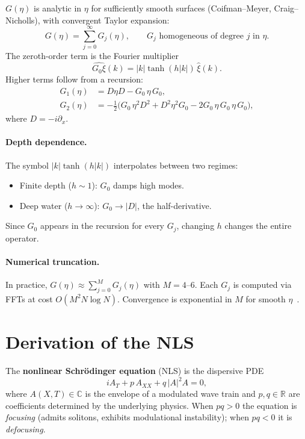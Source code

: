 \documentclass[11pt]{article}
\newcommand{\R}{\mathbb{R}}
\begin{document}
$G(\eta)$ is analytic in $\eta$ for sufficiently smooth surfaces
(Coifman--Meyer, Craig--Nicholls), with convergent Taylor expansion:
\[
G(\eta) = \sum_{j=0}^{\infty} G_j(\eta),
\qquad G_j \text{ homogeneous of degree } j \text{ in } \eta.
\]
The zeroth-order term is the Fourier multiplier
\begin{equation}
\widehat{G_0\xi}(k) = |k|\tanh(h|k|)\,\hat\xi(k).
\label{eq:G0}
\end{equation}
Higher terms follow from a recursion:
\begin{align}
G_1(\eta) &= D\eta D - G_0\,\eta\,G_0, \\
G_2(\eta) &= -\tfrac{1}{2}\bigl(G_0\,\eta^2 D^2 + D^2\eta^2 G_0
- 2G_0\,\eta\,G_0\,\eta\,G_0\bigr),
\end{align}
where $D = -i\partial_x$.

\paragraph{Depth dependence.}
The symbol $|k|\tanh(h|k|)$ interpolates between two regimes:
\begin{itemize}
\item Finite depth ($h \sim 1$): $G_0$ damps high modes.
\item Deep water ($h \to \infty$): $G_0 \to |D|$, the half-derivative.
\end{itemize}
Since $G_0$ appears in the recursion for every $G_j$, changing $h$ changes
the entire operator.

\paragraph{Numerical truncation.}
In practice, $G(\eta) \approx \sum_{j=0}^{M} G_j(\eta)$ with $M = 4$--$6$.
Each $G_j$ is computed via FFTs at cost $O(M^2 N\log N)$.
Convergence is exponential in $M$ for smooth $\eta$~\cite{xu2009}.


\section{Derivation of the NLS}
\label{sec:nls}

The \textbf{nonlinear Schr\"odinger equation} (NLS) is the dispersive PDE
\begin{equation}
iA_T + p\,A_{XX} + q\,|A|^2 A = 0,
\label{eq:nls_preview}
\end{equation}
where $A(X,T) \in \mathbb{C}$ is the envelope of a modulated wave train
and $p, q \in \R$ are coefficients determined by the underlying physics.
When $pq > 0$ the equation is \emph{focusing} (admits solitons, exhibits
modulational instability); when $pq < 0$ it is \emph{defocusing}.
\end{document}
